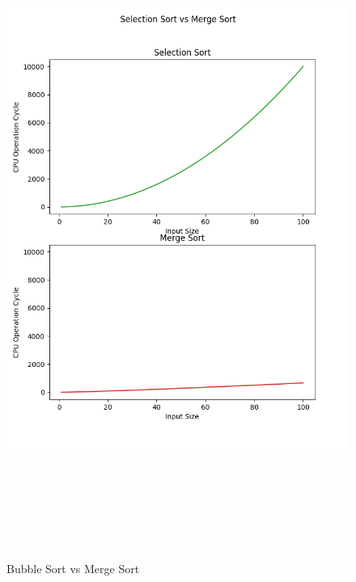 \documentclass{article}
\begin{document}
\begin{figure}[h]
    \centerline{\includegraphics[width=7in,height=8.5in]{Selection Sort_Merge Sort.png}}
    \caption{Bubble Sort vs Merge Sort}
\end{figure}
\end{document}
